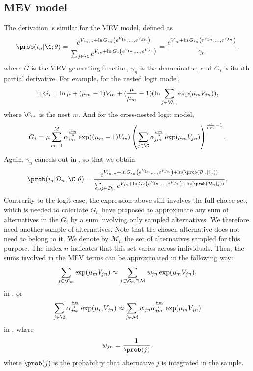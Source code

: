 \documentclass[12pt,a4paper]{article}
\newcommand{\D}{\mathcal{D}}
\begin{document}
\subsection{MEV model}
The derivation is similar for the MEV model, defined as
\[
\prob(i_n | \C;\theta) = \frac{e^{V_{i_n,n} + \ln G_{i_n}\left(e^{V_{1n}},\ldots,e^{V_{Jn}}\right)}}{\sum_{j\in\C} e^{V_{jn} + \ln G_j\left(e^{V_{1n}},\ldots,e^{V_{Jn}}\right)}} =  \frac{e^{V_{i_n} + \ln G_{i_n}\left(e^{V_{1n}},\ldots,e^{V_{Jn}}\right)}}{\gamma_n}.
    \]
    where $G$ is the MEV generating function, $\gamma_n$ is the denominator, and $G_i$ is its $i$th partial derivative. For example, for the nested logit model, 
    \begin{equation}
      \label{eq:gi_nested}
      \ln G_i = \ln \mu  + (\mu_m -1) V_{in} +(\frac{\mu}{\mu_m}-1)(\ln \sum_{j \in \C_m} \exp(\mu_m V_{jn})),
    \end{equation}
    where $\C_m$ is the nest $m$. And for the cross-nested logit model,
    \begin{equation}
      \label{eq:gi_cnl}
    G_i = \mu \sum_{m=1}^M \alpha_{im}^{\frac{\mu_m}{\mu}} \exp((\mu_m-1)V_{in})\left( \sum_{j\in\C} \alpha_{jm}^{\frac{\mu_m}{\mu}} \exp(\mu_m V_{jn}) \right)^{\frac{\mu}{\mu_m}-1}.
    \end{equation}
Again, $\gamma_n$ cancels out in  , so that we obtain
\begin{equation}
  \label{eq:mev}
\prob(i_n | \D_n, \C;\theta) = \frac{e^{V_{i_{n},n} + \ln G_{i_n}\left(e^{V_{1n}},\ldots,e^{V_{Jn}}\right)+ \ln(\prob(\mathcal{D}_n | i_n))}}{\sum_{j\in\D_n} e^{V_{jn} + \ln G_j\left(e^{V_{1n}},\ldots,e^{V_{Jn}}\right)+ \ln(\prob(\mathcal{D}_n | j))}}.
\end{equation}
Contrarily to the logit case, the expression above still involves the full choice set, which is needed to calculate $G_i$. 
 have proposed to approximate any sum of alternatives in the $G_i$ by a sum involving only sampled alternatives.  We therefore  need another sample of alternatives. Note that the chosen alternative does not need to belong to it. We denote by $\mathcal{M}_n$ the set of alternatives sampled for this purpose. The index $n$ indicates that this set varies across individuals.
Then, the sums involved in the MEV terms can be approximated in the following way:
\begin{equation}
  \label{eq:approx_nested}
  \sum_{j \in \C_m} \exp(\mu_m V_{jn}) \approx \sum_{j \in \C_m \cap \mathcal{M}} w_{jn}\exp(\mu_m V_{jn}),
\end{equation}
  in , or
\begin{equation}
  \label{eq:approx_cnl}
\sum_{j\in\C} \alpha_{jm}^{\frac{\mu_m}{\mu}} \exp(\mu_m V_{jn}) \approx \sum_{j\in\mathcal{M}}  w_{jn}\alpha_{jm}^{\frac{\mu_m}{\mu}} \exp(\mu_m V_{jn})
\end{equation}
in , where
\begin{equation}
  \label{eq:w}
    w_{jn} = \frac{1}{\prob(j)},
\end{equation}
    where $\prob(j)$ is the probability that alternative $j$ is integrated in the sample.
\end{document}
